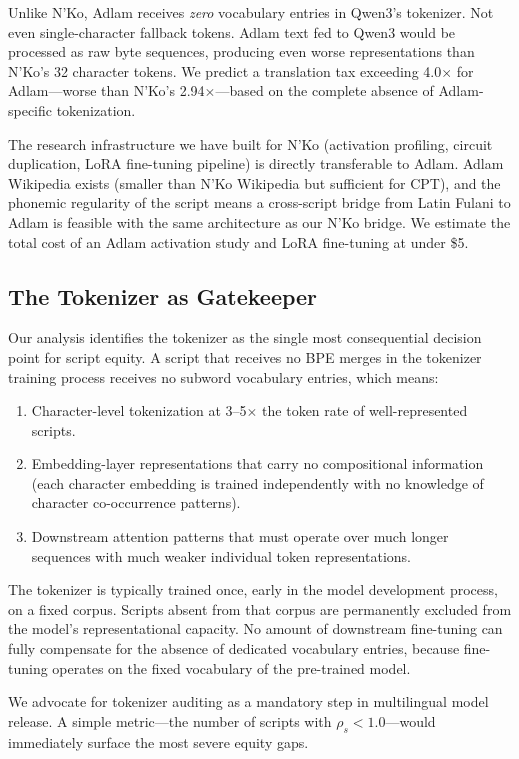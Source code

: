 \documentclass[11pt]{article}
\begin{document}
Unlike N'Ko, Adlam receives \emph{zero} vocabulary entries in Qwen3's tokenizer.
Not even single-character fallback tokens.
Adlam text fed to Qwen3 would be processed as raw byte sequences, producing even worse representations than N'Ko's 32 character tokens.
We predict a translation tax exceeding 4.0$\times$ for Adlam---worse than N'Ko's 2.94$\times$---based on the complete absence of Adlam-specific tokenization.

The research infrastructure we have built for N'Ko (activation profiling, circuit duplication, LoRA fine-tuning pipeline) is directly transferable to Adlam.
Adlam Wikipedia exists (smaller than N'Ko Wikipedia but sufficient for CPT), and the phonemic regularity of the script means a cross-script bridge from Latin Fulani to Adlam is feasible with the same architecture as our N'Ko bridge.
We estimate the total cost of an Adlam activation study and LoRA fine-tuning at under \$5.

\subsection{The Tokenizer as Gatekeeper}

Our analysis identifies the tokenizer as the single most consequential decision point for script equity.
A script that receives no BPE merges in the tokenizer training process receives no subword vocabulary entries, which means:
\begin{enumerate}
\item Character-level tokenization at 3--5$\times$ the token rate of well-represented scripts.
\item Embedding-layer representations that carry no compositional information (each character embedding is trained independently with no knowledge of character co-occurrence patterns).
\item Downstream attention patterns that must operate over much longer sequences with much weaker individual token representations.
\end{enumerate}

The tokenizer is typically trained once, early in the model development process, on a fixed corpus.
Scripts absent from that corpus are permanently excluded from the model's representational capacity.
No amount of downstream fine-tuning can fully compensate for the absence of dedicated vocabulary entries, because fine-tuning operates on the fixed vocabulary of the pre-trained model.

We advocate for tokenizer auditing as a mandatory step in multilingual model release.
A simple metric---the number of scripts with $\rho_s < 1.0$---would immediately surface the most severe equity gaps.
\end{document}
